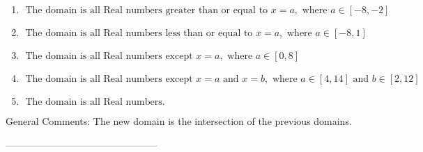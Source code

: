 \documentclass{extbook}[14pt]
\begin{document}
\begin{enumerate}[label=\Alph*.] 
\item $ \text{ The domain is all Real numbers greater than or equal to } x = a, \text{ where } a \in [-8, -2] $ 

  
\item $ \text{ The domain is all Real numbers less than or equal to } x = a, \text{ where } a \in [-8, 1] $ 

  
\item $ \text{ The domain is all Real numbers except } x = a, \text{ where } a \in [0, 8] $ 

  
\item $ \text{ The domain is all Real numbers except } x = a \text{ and } x = b, \text{ where } a \in [4, 14] \text{ and } b \in [2, 12] $ 

  
\item $ \text{ The domain is all Real numbers. } $ 

  
\end{enumerate} 
 
General Comments: The new domain is the intersection of the previous domains.

-----------------------------------------------
\end{document}
